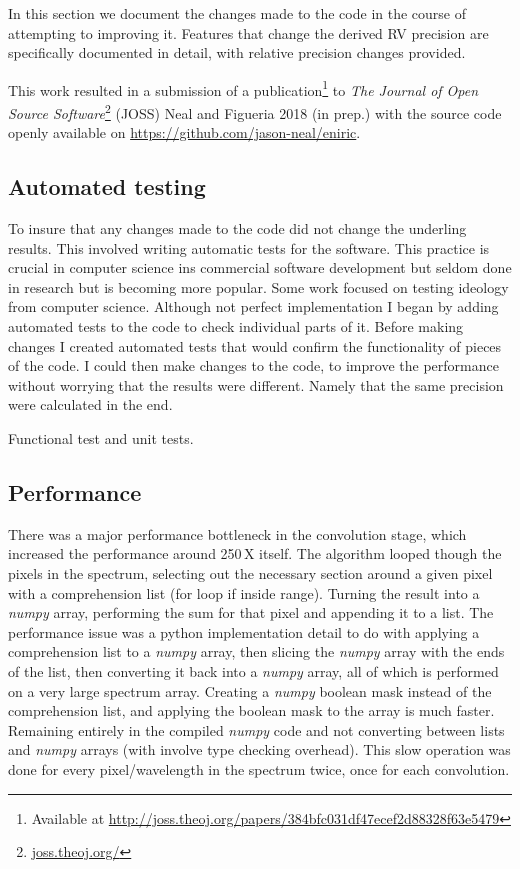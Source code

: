 In this section we document the changes made to the code in the course of attempting to improving it.
Features that change the derived {RV} precision are specifically documented in detail, with relative precision changes provided.

This work resulted in a submission of a publication\footnote{Available at \href{http://joss.theoj.org/papers/384bfc031df47ecef2d88328f63e5479}{http://joss.theoj.org/papers/384bfc031df47ecef2d88328f63e5479}} to \emph{The Journal of Open Source Software}\footnote{\href{http://joss.theoj.org/}{joss.theoj.org/}} (JOSS) {Neal and Figueria 2018 (in prep.)} with the source code openly available on \href{Github}{https://github.com/jason-neal/eniric}.


\subsection{Automated testing}
To insure that any changes made to the code did not change the underling results.
This involved writing automatic tests for the software.
This practice is crucial in computer science ins commercial software development but seldom done in research but is becoming more popular.
Some work focused on testing ideology from computer science.
Although not perfect implementation I began by adding automated tests to the code to check individual parts of it.
Before making changes I created automated tests that would confirm the functionality of pieces of the code.
I could then make changes to the code, to improve the performance without worrying that the results were different.
Namely that the same precision were calculated in the end.

Functional test and unit tests.


\subsection{Performance}
\label{subsec:code_performance}
There was a major performance bottleneck in the convolution stage, which increased the performance around 250\,X itself.
The algorithm looped though the pixels in the spectrum, selecting out the necessary section around a given pixel with a comprehension list (for loop if inside range).
Turning the result into a \emph{numpy} array, performing the sum for that pixel and appending it to a list.
The performance issue was a python implementation detail to do with applying a comprehension list to a \emph{numpy} array, then slicing the \emph{numpy} array with the ends of the list, then converting it back into a \emph{numpy} array, all of which is performed on a very large spectrum array.
Creating a \emph{numpy} boolean mask instead of the comprehension list, and applying the boolean mask to the array is much faster.
Remaining entirely in the compiled \emph{numpy} code and not converting between lists and \emph{numpy} arrays (with involve type checking overhead).
This slow operation was done for every pixel/wavelength in the spectrum twice, once for each convolution.

